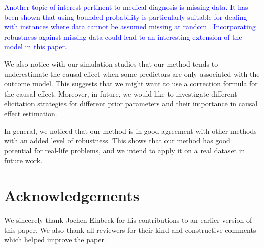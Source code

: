 \documentclass[preprint,12pt]{elsarticle}
\newcommand{\added}[1]{\textcolor{blue}{#1}}
\begin{document}
\added{%
Another topic of interest pertinent to medical diagnosis is missing data.
It has been shown that using bounded probability is particularly suitable
for dealing with instances where data cannot be assumed missing at random
\citep{decoomanzaffalon2004}.
Incorporating robustness against missing data could lead to an interesting
extension of the model in this paper.%
}

We also notice with our simulation studies that our
method tends to underestimate the causal effect
when some predictors are only associated with the
outcome model. This suggests that we might want
to use a correction formula for the causal effect.
Moreover, in future, we would
like to investigate different elicitation strategies for different prior parameters and their importance in causal effect estimation. 


In general, we noticed that our method
is in good agreement with other methods with an added level of robustness.
This shows that our method has good potential for real-life problems,
and we intend to apply it on a real dataset in future work.

\section*{Acknowledgements}

We sincerely thank Jochen Einbeck for his contributions to an earlier version of this paper.
We also thank all reviewers for their kind and constructive comments which helped improve the paper.

 

\end{document}
